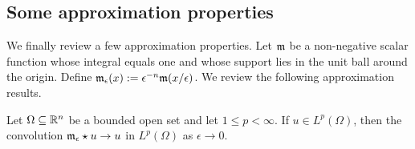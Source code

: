 \documentclass[10pt,a4paper]{article}
\begin{document}
\subsection{Some approximation properties}

We finally review a few approximation properties. 
Let ${\mathfrak m}$ be a non-negative scalar function whose integral equals one and whose support lies in the unit ball around the origin.
Define ${\mathfrak m}_{\epsilon}(x) := \epsilon^{-n} {\mathfrak m}(x/\epsilon)$. We review the following approximation results.

\begin{lemma}
    Let $\Omega \subseteq {\mathbb R}^{n}$ be a bounded open set and let $1 \leq p < \infty$. 
    If $u \in L^{p}(\Omega)$, then the convolution ${\mathfrak m}_{\epsilon} \star u \rightarrow u$ in $L^{p}(\Omega)$ as $\epsilon \rightarrow 0$.
\end{lemma}

\end{document}
